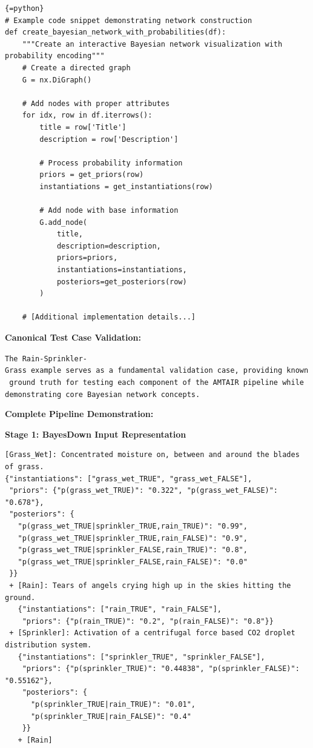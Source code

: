 \documentclass[
  11pt,
  letterpaper,
]{book}
\begin{document}
\begin{verbatim}
{=python}
# Example code snippet demonstrating network construction
def create_bayesian_network_with_probabilities(df):
    """Create an interactive Bayesian network visualization with probability encoding"""
    # Create a directed graph
    G = nx.DiGraph()
    
    # Add nodes with proper attributes
    for idx, row in df.iterrows():
        title = row['Title']
        description = row['Description']
        
        # Process probability information
        priors = get_priors(row)
        instantiations = get_instantiations(row)
        
        # Add node with base information
        G.add_node(
            title,
            description=description,
            priors=priors,
            instantiations=instantiations,
            posteriors=get_posteriors(row)
        )
    
    # [Additional implementation details...]
\end{verbatim}

\textbf{Canonical Test Case Validation:}

\texttt{The\ Rain-Sprinkler-Grass\ example\ serves\ as\ a\ fundamental\ validation\ case,\ providing\ known\ ground\ truth\ for\ testing\ each\ component\ of\ the\ AMTAIR\ pipeline\ while\ demonstrating\ core\ Bayesian\ network\ concepts.}

\textbf{Complete Pipeline Demonstration:}

\textbf{Stage 1: BayesDown Input Representation}

\begin{verbatim}
[Grass_Wet]: Concentrated moisture on, between and around the blades of grass. 
{"instantiations": ["grass_wet_TRUE", "grass_wet_FALSE"], 
 "priors": {"p(grass_wet_TRUE)": "0.322", "p(grass_wet_FALSE)": "0.678"},
 "posteriors": {
   "p(grass_wet_TRUE|sprinkler_TRUE,rain_TRUE)": "0.99",
   "p(grass_wet_TRUE|sprinkler_TRUE,rain_FALSE)": "0.9",
   "p(grass_wet_TRUE|sprinkler_FALSE,rain_TRUE)": "0.8", 
   "p(grass_wet_TRUE|sprinkler_FALSE,rain_FALSE)": "0.0"
 }}
 + [Rain]: Tears of angels crying high up in the skies hitting the ground.
   {"instantiations": ["rain_TRUE", "rain_FALSE"],
    "priors": {"p(rain_TRUE)": "0.2", "p(rain_FALSE)": "0.8"}}
 + [Sprinkler]: Activation of a centrifugal force based CO2 droplet distribution system.
   {"instantiations": ["sprinkler_TRUE", "sprinkler_FALSE"], 
    "priors": {"p(sprinkler_TRUE)": "0.44838", "p(sprinkler_FALSE)": "0.55162"},
    "posteriors": {
      "p(sprinkler_TRUE|rain_TRUE)": "0.01",
      "p(sprinkler_TRUE|rain_FALSE)": "0.4"
    }}
   + [Rain]
\end{verbatim}
\end{document}
